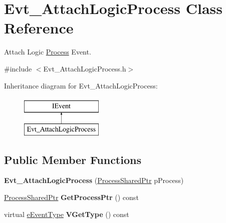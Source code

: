 \hypertarget{classEvt__AttachLogicProcess}{\section{Evt\-\_\-\-Attach\-Logic\-Process Class Reference}
\label{classEvt__AttachLogicProcess}
}


Attach Logic \hyperlink{classProcess}{Process} Event.  




{\ttfamily \#include $<$Evt\-\_\-\-Attach\-Logic\-Process.\-h$>$}

Inheritance diagram for Evt\-\_\-\-Attach\-Logic\-Process\-:\begin{figure}[H]
\begin{center}
\leavevmode
\includegraphics[height=2.000000cm]{classEvt__AttachLogicProcess}
\end{center}
\end{figure}
\subsection*{Public Member Functions}
\begin{DoxyCompactItemize}
\item 
\hypertarget{classEvt__AttachLogicProcess_ad65c8a9b67671492ac152f4d9942790e}{{\bfseries Evt\-\_\-\-Attach\-Logic\-Process} (\hyperlink{Process_8h_af04951552f62d8a3c69cca91c23500cc}{Process\-Shared\-Ptr} p\-Process)}\label{classEvt__AttachLogicProcess_ad65c8a9b67671492ac152f4d9942790e}

\item 
\hypertarget{classEvt__AttachLogicProcess_a8d1e289a5350fe4c6dff91785e0cf956}{\hyperlink{Process_8h_af04951552f62d8a3c69cca91c23500cc}{Process\-Shared\-Ptr} {\bfseries Get\-Process\-Ptr} () const }\label{classEvt__AttachLogicProcess_a8d1e289a5350fe4c6dff91785e0cf956}

\item 
\hypertarget{classEvt__AttachLogicProcess_aa9d5ddf4ff7cd4ab41633bfd62483b60}{virtual \hyperlink{IEvent_8h_a052e637824ed8cb8a5e9d5d73b5b3c8b}{e\-Event\-Type} {\bfseries V\-Get\-Type} () const }\label{classEvt__AttachLogicProcess_aa9d5ddf4ff7cd4ab41633bfd62483b60}

\end{DoxyCompactItemize}



